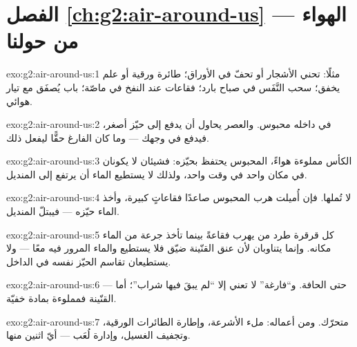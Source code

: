 \section*{الفصل \ref{ch:g2:air-around-us} --- الهواء من حولنا}

\begin{solution}{exo:g2:air-around-us:1}
مثلًا:  تحني الأشجار أو تحفّ في الأوراق؛ طائرة ورقية أو
علم يخفق؛ سحب النَّفَس في صباح بارد؛ فقاعات عند النفخ في ماصّة؛
باب يُصفَق مع تيار هوائي.
\end{solution}

\begin{solution}{exo:g2:air-around-us:2}
في داخله  محبوس. والعصر يحاول أن يدفع  إلى حيّز أصغر،
فيدفع  في وجهك --- وما كان الفارغ حقًّا ليفعل ذلك.
\end{solution}

\begin{solution}{exo:g2:air-around-us:3}
الكأس مملوءة هواءً،  المحبوس يحتفظ بحيّزه: فشيئان لا
يكونان في مكان واحد في وقت واحد، ولذلك لا يستطيع الماء أن يرتفع
إلى المنديل.
\end{solution}

\begin{solution}{exo:g2:air-around-us:4}
لا تُملها. فإن أُميلت هرب  المحبوس صاعدًا فقاعاتٍ كبيرة،
وأخذ الماء حيّزه --- فيبتلّ المنديل.
\end{solution}

\begin{solution}{exo:g2:air-around-us:5}
كل قرقرة طرد من  يهرب فقاعةً بينما تأخذ جرعة من الماء
مكانه. وإنما يتناوبان لأن عنق القنّينة ضيّق فلا يستطيع 
والماء المرور فيه معًا --- ولا يستطيعان تقاسم الحيّز نفسه في
الداخل.
\end{solution}

\begin{solution}{exo:g2:air-around-us:6}
 --- حتى الحافة. و``فارغة'' لا تعني إلا ``لم يبقَ فيها
شراب''؛ أما القنّينة فمملوءة بمادة خفيّة.
\end{solution}

\begin{solution}{exo:g2:air-around-us:7}
  متحرّك. ومن أعماله: ملء الأشرعة، وإطارة الطائرات
الورقية، وتجفيف الغسيل، وإدارة لُعَب  --- أيّ اثنين منها.
\end{solution}

